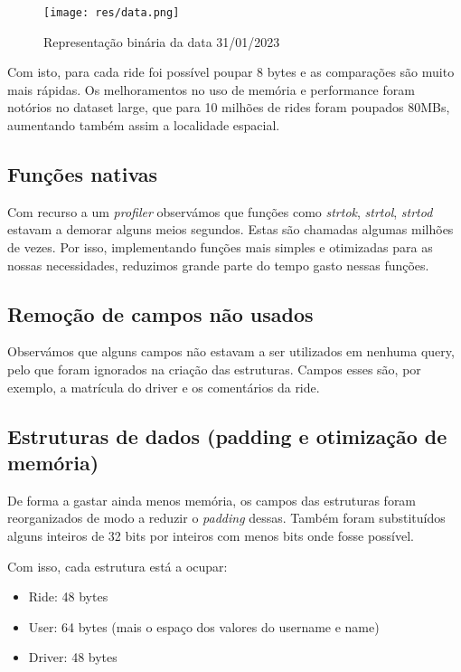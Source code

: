 \documentclass{article}
\begin{document}
            \begin{figure}[h]
                \centering
                \texttt{[image: res/data.png]}
                \caption{Representação binária da data 31/01/2023}
            \end{figure}
            Com isto, para cada ride foi possível poupar 8 bytes e as comparações são
            muito mais rápidas. Os melhoramentos no uso de memória e performance foram
            notórios no dataset large, que para 10 milhões de rides foram poupados 80MBs,
            aumentando também assim a localidade espacial.
        \subsection{Funções nativas}
            Com recurso a um \textit{profiler} observámos que funções como \textit{strtok}, \textit{strtol},
            \textit{strtod} estavam a demorar alguns meios segundos. Estas são chamadas algumas milhões de vezes.
            Por isso, implementando funções mais simples e otimizadas para as nossas necessidades, 
            reduzimos grande parte do tempo gasto nessas funções.
        \subsection{Remoção de campos não usados}
            Observámos que alguns campos não estavam a ser utilizados em nenhuma query, 
            pelo que foram ignorados na criação das estruturas.
            Campos esses são, por exemplo, a matrícula do driver e os comentários da ride.
        \subsection{Estruturas de dados (padding e otimização de memória)}
            De forma a gastar ainda menos memória, os campos das estruturas
            foram reorganizados de modo a reduzir o \textit{padding} dessas.
            Também foram substituídos alguns inteiros de 32 bits por inteiros com menos bits
            onde fosse possível.
            
            Com isso, cada estrutura está a ocupar:
            \begin{itemize}
                \item Ride: 48 bytes
                \item User: 64 bytes (mais o espaço dos valores do username e name)
                \item Driver: 48 bytes
            \end{itemize}
\end{document}
